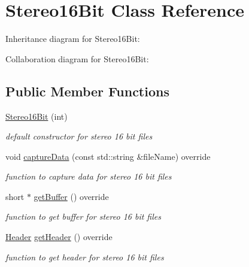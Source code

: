 \hypertarget{classStereo16Bit}{}\section{Stereo16\+Bit Class Reference}
\label{classStereo16Bit}


Inheritance diagram for Stereo16\+Bit\+:


Collaboration diagram for Stereo16\+Bit\+:
\subsection*{Public Member Functions}
\begin{DoxyCompactItemize}
\item 
\mbox{\label{classStereo16Bit_a1e3d51fe31b8228887aa918a83126dad}} 
\hyperlink{classStereo16Bit_a1e3d51fe31b8228887aa918a83126dad}{Stereo16\+Bit} (int)
\begin{DoxyCompactList}\small\item\em default constructor for stereo 16 bit files \end{DoxyCompactList}\item 
void \hyperlink{classStereo16Bit_a74c0ba8999456fab1de7e035e2225fa9}{capture\+Data} (const std\+::string \&file\+Name) override
\begin{DoxyCompactList}\small\item\em function to capture data for stereo 16 bit files \end{DoxyCompactList}\item 
\mbox{\label{classStereo16Bit_ae1040b43247361e5369742ce2711ca6a}} 
short $\ast$ \hyperlink{classStereo16Bit_ae1040b43247361e5369742ce2711ca6a}{get\+Buffer} () override
\begin{DoxyCompactList}\small\item\em function to get buffer for stereo 16 bit files \end{DoxyCompactList}\item 
\mbox{\label{classStereo16Bit_a5e88a7aec404061902043d4247a168aa}} 
\hyperlink{structHeader}{Header} \hyperlink{classStereo16Bit_a5e88a7aec404061902043d4247a168aa}{get\+Header} () override
\begin{DoxyCompactList}\small\item\em function to get header for stereo 16 bit files \end{DoxyCompactList}\item 

\end{DoxyCompactItemize}
